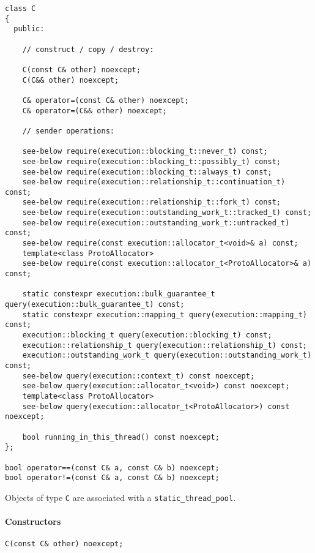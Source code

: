 \documentclass[a4paper,12pt,notitlepage,twoside,openright]{article}
\begin{document}
\begin{verbatim}
class C
{
  public:

    // construct / copy / destroy:

    C(const C& other) noexcept;
    C(C&& other) noexcept;

    C& operator=(const C& other) noexcept;
    C& operator=(C&& other) noexcept;

    // sender operations:

    see-below require(execution::blocking_t::never_t) const;
    see-below require(execution::blocking_t::possibly_t) const;
    see-below require(execution::blocking_t::always_t) const;
    see-below require(execution::relationship_t::continuation_t) const;
    see-below require(execution::relationship_t::fork_t) const;
    see-below require(execution::outstanding_work_t::tracked_t) const;
    see-below require(execution::outstanding_work_t::untracked_t) const;
    see-below require(const execution::allocator_t<void>& a) const;
    template<class ProtoAllocator>
    see-below require(const execution::allocator_t<ProtoAllocator>& a) const;

    static constexpr execution::bulk_guarantee_t query(execution::bulk_guarantee_t) const;
    static constexpr execution::mapping_t query(execution::mapping_t) const;
    execution::blocking_t query(execution::blocking_t) const;
    execution::relationship_t query(execution::relationship_t) const;
    execution::outstanding_work_t query(execution::outstanding_work_t) const;
    see-below query(execution::context_t) const noexcept;
    see-below query(execution::allocator_t<void>) const noexcept;
    template<class ProtoAllocator>
    see-below query(execution::allocator_t<ProtoAllocator>) const noexcept;

    bool running_in_this_thread() const noexcept;
};

bool operator==(const C& a, const C& b) noexcept;
bool operator!=(const C& a, const C& b) noexcept;
\end{verbatim}

Objects of type \texttt{C} are associated with a
\texttt{static_thread_pool}.

\hypertarget{constructors-1}{%
\paragraph{Constructors}\label{constructors-1}}

\begin{verbatim}
C(const C& other) noexcept;
\end{verbatim}
\end{document}
